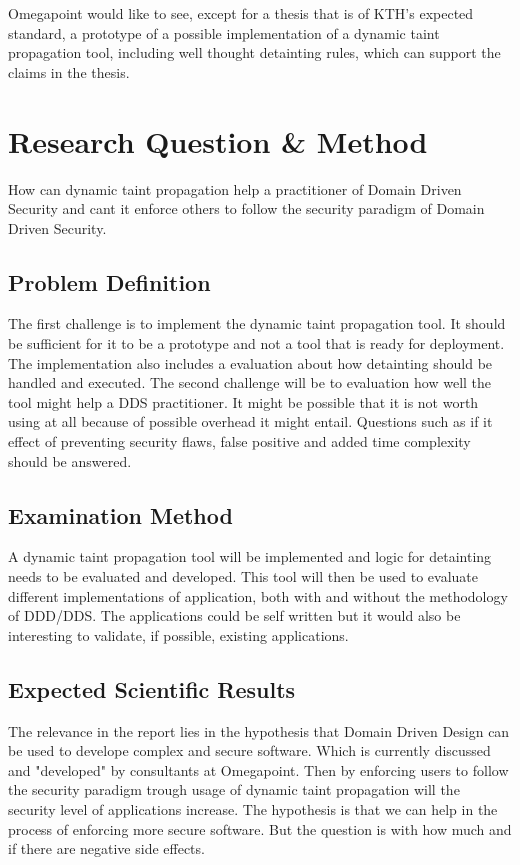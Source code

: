 \documentclass{../kththesis}
\begin{document}
Omegapoint would like to see, except for a thesis that is of KTH's expected standard, a prototype of a possible implementation of a dynamic taint propagation tool, including well thought detainting rules, which can support the claims in the thesis.



\chapter{Research Question \& Method}
How can dynamic taint propagation help a practitioner of Domain Driven Security and cant it enforce others to follow the security paradigm of Domain Driven Security.


\section{Problem Definition}
The first challenge is to implement the dynamic taint propagation tool. It should be sufficient for it to be a prototype and not a tool that is ready for deployment. The implementation also includes a evaluation about how detainting should be handled and executed. The second challenge will be to evaluation how well the tool might help a DDS practitioner. It might be possible that it is not worth using at all because of possible overhead it might entail. Questions such as if it effect of preventing security flaws, false positive and added time complexity should be answered.


\section{Examination Method}
A dynamic taint propagation tool will be implemented and logic for detainting needs to be evaluated and developed. This tool will then be used to evaluate different implementations of application, both with and without the methodology of DDD/DDS. The applications could be self written but it would also be interesting to validate, if possible, existing applications.


\section{Expected Scientific Results}
The relevance in the report lies in the hypothesis that Domain Driven Design can be used to develope complex and secure software. Which is currently discussed and "developed" by consultants at Omegapoint. Then by enforcing users to follow the security paradigm trough usage of dynamic taint propagation will the security level of applications increase. The hypothesis is that we can help in the process of enforcing more secure software. But the question is with how much and if there are negative side effects.
\end{document}
